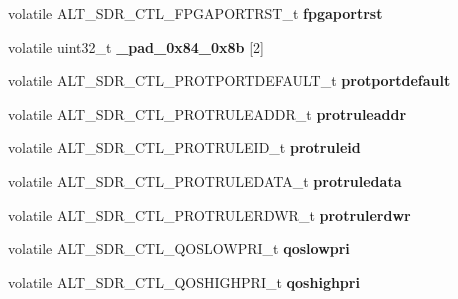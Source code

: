 \begin{DoxyCompactItemize}
volatile A\+L\+T\+\_\+\+S\+D\+R\+\_\+\+C\+T\+L\+\_\+\+F\+P\+G\+A\+P\+O\+R\+T\+R\+S\+T\+\_\+t {\bfseries fpgaportrst}
\item 
\mbox{\label{structALT__SDR__CTL__s_a22660deba511d99689408cda60245aaa}} 
volatile uint32\+\_\+t {\bfseries \+\_\+pad\+\_\+0x84\+\_\+0x8b} \mbox{[}2\mbox{]}
\item 
\mbox{\label{structALT__SDR__CTL__s_afde5993305d94eee9a590d14ea04e3ff}} 
volatile A\+L\+T\+\_\+\+S\+D\+R\+\_\+\+C\+T\+L\+\_\+\+P\+R\+O\+T\+P\+O\+R\+T\+D\+E\+F\+A\+U\+L\+T\+\_\+t {\bfseries protportdefault}
\item 
\mbox{\label{structALT__SDR__CTL__s_ade8a76b0e0789db5f7ded464b4343685}} 
volatile A\+L\+T\+\_\+\+S\+D\+R\+\_\+\+C\+T\+L\+\_\+\+P\+R\+O\+T\+R\+U\+L\+E\+A\+D\+D\+R\+\_\+t {\bfseries protruleaddr}
\item 
\mbox{\label{structALT__SDR__CTL__s_aae0893ec6a40759b54d5d2fe1a1742ff}} 
volatile A\+L\+T\+\_\+\+S\+D\+R\+\_\+\+C\+T\+L\+\_\+\+P\+R\+O\+T\+R\+U\+L\+E\+I\+D\+\_\+t {\bfseries protruleid}
\item 
\mbox{\label{structALT__SDR__CTL__s_af3662a2b0f9ca57f008f63ba5a63fc8f}} 
volatile A\+L\+T\+\_\+\+S\+D\+R\+\_\+\+C\+T\+L\+\_\+\+P\+R\+O\+T\+R\+U\+L\+E\+D\+A\+T\+A\+\_\+t {\bfseries protruledata}
\item 
\mbox{\label{structALT__SDR__CTL__s_ad3c0e0241fe52193d9cdee4d83dd003a}} 
volatile A\+L\+T\+\_\+\+S\+D\+R\+\_\+\+C\+T\+L\+\_\+\+P\+R\+O\+T\+R\+U\+L\+E\+R\+D\+W\+R\+\_\+t {\bfseries protrulerdwr}
\item 
\mbox{\label{structALT__SDR__CTL__s_a7b43f5322f992db22174e3c04a249a36}} 
volatile A\+L\+T\+\_\+\+S\+D\+R\+\_\+\+C\+T\+L\+\_\+\+Q\+O\+S\+L\+O\+W\+P\+R\+I\+\_\+t {\bfseries qoslowpri}
\item 
\mbox{\label{structALT__SDR__CTL__s_a3db91b76021f92c5bacd4a68ad8e4b3e}} 
volatile A\+L\+T\+\_\+\+S\+D\+R\+\_\+\+C\+T\+L\+\_\+\+Q\+O\+S\+H\+I\+G\+H\+P\+R\+I\+\_\+t {\bfseries qoshighpri}
\item 
\mbox{\label{structALT__SDR__CTL__s_a59ba8fd0efc1bd38905c32e15d310bb3}} 

\end{DoxyCompactItemize}
